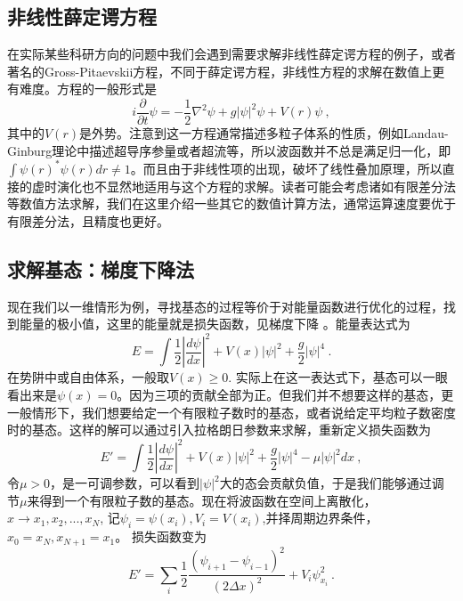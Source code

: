 
\begin{issues}
\issueTODO
\end{issues}

\subsection{非线性薛定谔方程}
在实际某些科研方向的问题中我们会遇到需要求解非线性薛定谔方程的例子，或者著名的Gross-Pitaevskii方程，不同于薛定谔方程，非线性方程的求解在数值上更有难度。方程的一般形式是
\begin{equation}
i \frac{\partial}{\partial t} \psi = -\frac{1}{2}\nabla^2 \psi + g |\psi|^2 \psi + V(r)\psi~,
\end{equation}
其中的$V(r)$是外势。注意到这一方程通常描述多粒子体系的性质，例如Landau-Ginburg理论中描述超导序参量或者超流等，所以波函数并不总是满足归一化，即$\int \psi(r)^*\psi(r) dr \neq 1$。而且由于非线性项的出现，破坏了线性叠加原理，所以直接的虚时演化也不显然地适用与这个方程的求解。读者可能会考虑诸如有限差分法等数值方法求解，我们在这里介绍一些其它的数值计算方法，通常运算速度要优于有限差分法，且精度也更好。
\subsection{求解基态：梯度下降法}
现在我们以一维情形为例，寻找基态的过程等价于对能量函数进行优化的过程，找到能量的极小值，这里的能量就是损失函数，见梯度下降 。能量表达式为
\begin{equation}
E = \int \frac{1}{2}|\frac{d \psi}{dx}|^2 + V(x)|\psi|^2 + \frac{g}{2}|\psi|^4~.
\end{equation}
在势阱中或自由体系，一般取$V(x)\ge 0$. 实际上在这一表达式下，基态可以一眼看出来是$\psi(x) = 0$。因为三项的贡献全部为正。但我们并不想要这样的基态，更一般情形下，我们想要给定一个有限粒子数时的基态，或者说给定平均粒子数密度时的基态。这样的解可以通过引入拉格朗日参数来求解，重新定义损失函数为
\begin{equation}
E' = \int \frac{1}{2}|\frac{d\psi}{dx}|^2 + V(x)|\psi|^2 + \frac{g}{2}|\psi|^4 -\mu |\psi|^2 dx ~,
\end{equation}
令$\mu>0$，是一可调参数，可以看到$|\psi|^2$大的态会贡献负值，于是我们能够通过调节$\mu$来得到一个有限粒子数的基态。现在将波函数在空间上离散化，$x\rightarrow x_1,x_2,...,x_N$, 记$\psi_i = \psi(x_i),V_i = V(x_i)$,并择周期边界条件，$x_0 = x_N, x_{N+1}= x_1$。 损失函数变为
\begin{equation}
E' =\sum_i \frac{1}{2} \frac{(\psi_{i+1}-\psi_{i-1})^2}{(2\Delta x)^2} + V_i\psi_{x_i}^2 ~.
\end{equation}

